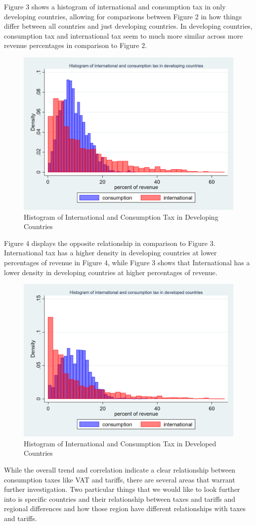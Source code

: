 \documentclass[12pt]{article}
\begin{document}
Figure 3 shows a histogram of international and consumption tax in only developing countries, allowing for comparisons between Figure 2 in how things differ between all countries and just developing countries. In developing countries, consumption tax and international tax seem to much more similar across more revenue percentages in comparison to Figure 2. 

\begin{figure}[h]
    \centering
    \includegraphics[width=0.5\linewidth]{Reproducibility_Package//png_files/twowayhistdevelopingintcons.png}
    \caption{Histogram of International and Consumption Tax in Developing Countries}
    \label{fig:enter-label}
\end{figure}

Figure 4 displays the opposite relationship in comparison to Figure 3. International tax has a higher density in developing countries at lower percentages of revenue in Figure 4, while Figure 3 shows that International has a lower density in developing countries at higher percentages of revenue. 

\begin{figure}[h]
    \centering
    \includegraphics[width=0.5\linewidth]{Reproducibility_Package//png_files/twowayhistdevelopedintcons.png}
    \caption{Histogram of International and Consumption Tax in Developed Countries}
    \label{fig:enter-label}
\end{figure}

While the overall trend and correlation indicate a clear relationship between consumption taxes like VAT and tariffs, there are several areas that warrant further investigation. Two particular things that we would like to look further into is specific countries and their relationship between taxes and tariffs and regional differences and how those region have different relationships with taxes and tariffs.
\end{document}

